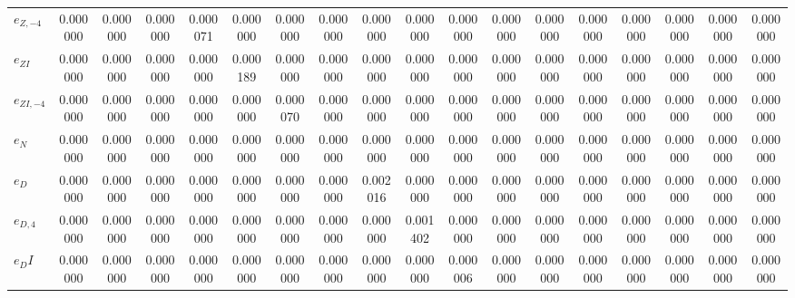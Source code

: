 \begin{center}
\begin{longtable}{lccccccccccccccccc}
${e_{Z,-4}}    $	 & 	        0.000000	 & 	        0.000000	 & 	        0.000000	 & 	        0.000071	 & 	        0.000000	 & 	        0.000000	 & 	        0.000000	 & 	        0.000000	 & 	        0.000000	 & 	        0.000000	 & 	        0.000000	 & 	        0.000000	 & 	        0.000000	 & 	        0.000000	 & 	        0.000000	 & 	        0.000000	 & 	        0.000000 \\ 
${e_{ZI}}      $	 & 	        0.000000	 & 	        0.000000	 & 	        0.000000	 & 	        0.000000	 & 	        0.000189	 & 	        0.000000	 & 	        0.000000	 & 	        0.000000	 & 	        0.000000	 & 	        0.000000	 & 	        0.000000	 & 	        0.000000	 & 	        0.000000	 & 	        0.000000	 & 	        0.000000	 & 	        0.000000	 & 	        0.000000 \\ 
${e_{ZI,-4}}   $	 & 	        0.000000	 & 	        0.000000	 & 	        0.000000	 & 	        0.000000	 & 	        0.000000	 & 	        0.000070	 & 	        0.000000	 & 	        0.000000	 & 	        0.000000	 & 	        0.000000	 & 	        0.000000	 & 	        0.000000	 & 	        0.000000	 & 	        0.000000	 & 	        0.000000	 & 	        0.000000	 & 	        0.000000 \\ 
${e_N}         $	 & 	        0.000000	 & 	        0.000000	 & 	        0.000000	 & 	        0.000000	 & 	        0.000000	 & 	        0.000000	 & 	        0.000000	 & 	        0.000000	 & 	        0.000000	 & 	        0.000000	 & 	        0.000000	 & 	        0.000000	 & 	        0.000000	 & 	        0.000000	 & 	        0.000000	 & 	        0.000000	 & 	        0.000000 \\ 
${e_D}         $	 & 	        0.000000	 & 	        0.000000	 & 	        0.000000	 & 	        0.000000	 & 	        0.000000	 & 	        0.000000	 & 	        0.000000	 & 	        0.002016	 & 	        0.000000	 & 	        0.000000	 & 	        0.000000	 & 	        0.000000	 & 	        0.000000	 & 	        0.000000	 & 	        0.000000	 & 	        0.000000	 & 	        0.000000 \\ 
${e_{D,4}}     $	 & 	        0.000000	 & 	        0.000000	 & 	        0.000000	 & 	        0.000000	 & 	        0.000000	 & 	        0.000000	 & 	        0.000000	 & 	        0.000000	 & 	        0.001402	 & 	        0.000000	 & 	        0.000000	 & 	        0.000000	 & 	        0.000000	 & 	        0.000000	 & 	        0.000000	 & 	        0.000000	 & 	        0.000000 \\ 
${e_DI}        $	 & 	        0.000000	 & 	        0.000000	 & 	        0.000000	 & 	        0.000000	 & 	        0.000000	 & 	        0.000000	 & 	        0.000000	 & 	        0.000000	 & 	        0.000000	 & 	        0.000006	 & 	        0.000000	 & 	        0.000000	 & 	        0.000000	 & 	        0.000000	 & 	        0.000000	 & 	        0.000000	 & 	        0.000000 \\ 

\end{longtable}
\end{center}
